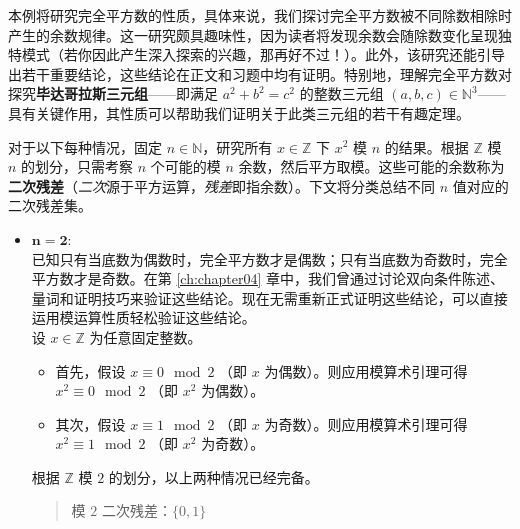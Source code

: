 \begin{example}\label{ex:example6.5.15}

    本例将研究完全平方数的性质，具体来说，我们探讨完全平方数被不同除数相除时产生的余数规律。这一研究颇具趣味性，因为读者将发现余数会随除数变化呈现独特模式（若你因此产生深入探索的兴趣，那再好不过！）。此外，该研究还能引导出若干重要结论，这些结论在正文和习题中均有证明。特别地，理解完全平方数对探究\textbf{毕达哥拉斯三元组}——即满足 $a^2 + b^2 = c^2$ 的整数三元组 $(a, b, c) \in \mathbb{N}^3$——具有关键作用，其性质可以帮助我们证明关于此类三元组的若干有趣定理。

    对于以下每种情况，固定 $n \in \mathbb{N}$，研究所有 $x \in \mathbb{Z}$ 下 $x^2$ 模 $n$ 的结果。根据 $\mathbb{Z}$ 模 $n$ 的划分，只需考察 $n$ 个可能的模 $n$ 余数，然后平方取模。这些可能的余数称为\textbf{二次残差}（\emph{二次}源于平方运算，\emph{残差}即指余数）。下文将分类总结不同 $n$ 值对应的二次残差集。

    \begin{itemize}
        \item $\mathbf{n=2}$:\\
        已知只有当底数为偶数时，完全平方数才是偶数；只有当底数为奇数时，完全平方数才是奇数。在第 \ref{ch:chapter04} 章中，我们曾通过讨论双向条件陈述、量词和证明技巧来验证这些结论。现在无需重新正式证明这些结论，可以直接运用模运算性质轻松验证这些结论。\\
        设 $x \in \mathbb{Z}$ 为任意固定整数。
        \begin{itemize}
            \item 首先，假设 $x \equiv 0 \mod 2$ （即 $x$ 为偶数）。则应用模算术引理可得 $x^2 \equiv 0 \mod 2$ （即 $x^2$ 为偶数）。
            \item 其次，假设 $x \equiv 1 \mod 2$ （即 $x$ 为奇数）。则应用模算术引理可得 $x^2 \equiv 1 \mod 2$ （即 $x^2$ 为奇数）。
        \end{itemize}
        根据 $\mathbb{Z}$ 模 $2$ 的划分，以上两种情况已经完备。
        \begin{quotation}
            \begin{center}
                \large 模 $2$ 二次残差：$\{0, 1\}$
            \end{center}
        \end{quotation}


\end{itemize}
\end{example}
